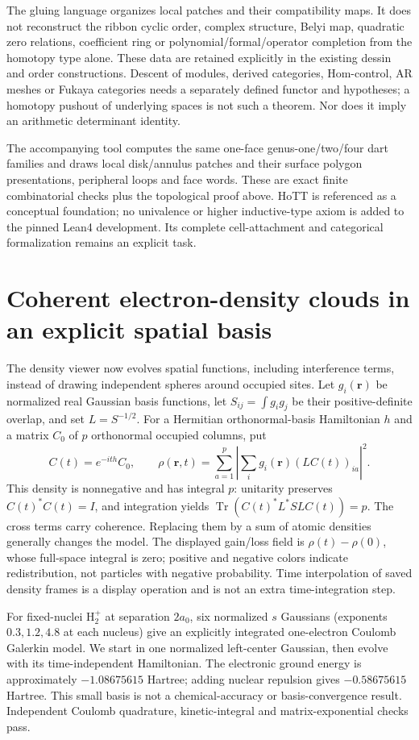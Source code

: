 \documentclass[11pt]{article}
\theoremstyle{definition}\newtheorem{definition}[theorem]{Definition}
\theoremstyle{remark}\newtheorem{remark}[theorem]{Remark}
\begin{document}
The gluing language organizes local patches and their compatibility maps.
It does not reconstruct the ribbon cyclic order, complex structure, Belyi
map, quadratic zero relations, coefficient ring or polynomial/formal/operator
completion from the homotopy type alone. These data are retained explicitly
in the existing dessin and order constructions. Descent of modules, derived
categories, Hom-control, AR meshes or Fukaya categories needs a separately
defined functor and hypotheses; a homotopy pushout of underlying spaces is
not such a theorem. Nor does it imply an arithmetic determinant identity.

The accompanying tool computes the same one-face genus-one/two/four dart
families and draws local disk/annulus patches and their surface polygon
presentations, peripheral loops and face words. These
are exact finite combinatorial checks plus the topological proof above.
HoTT is referenced as a conceptual foundation; no univalence or higher
inductive-type axiom is added to the pinned Lean4 development. Its complete
cell-attachment and categorical formalization remains an explicit task.


\section{Coherent electron-density clouds in an explicit spatial basis}
The density viewer now evolves spatial functions, including interference
terms, instead of drawing independent spheres around occupied sites. Let
$g_i(\mathbf r)$ be normalized real Gaussian basis functions, let
$S_{ij}=\int g_i g_j$ be their positive-definite overlap, and set
$L=S^{-1/2}$. For a Hermitian orthonormal-basis Hamiltonian $h$ and a matrix
$C_0$ of $p$ orthonormal occupied columns, put
\[
 C(t)=e^{-ith}C_0,\qquad
 \rho(\mathbf r,t)=\sum_{a=1}^p
       \left|\sum_i g_i(\mathbf r)(LC(t))_{ia}\right|^2.
\]
This density is nonnegative and has integral $p$: unitarity preserves
$C(t)^*C(t)=I$, and integration yields
$\operatorname{Tr}(C(t)^*L^*SL C(t))=p$. The cross terms carry coherence.
Replacing them by a sum of atomic densities generally changes the model.
The displayed gain/loss field is $\rho(t)-\rho(0)$, whose full-space integral
is zero; positive and negative colors indicate redistribution, not particles
with negative probability. Time interpolation of saved density frames is a
display operation and is not an extra time-integration step.

For fixed-nuclei $\mathrm H_2^+$ at separation $2a_0$, six normalized $s$
Gaussians (exponents $0.3,1.2,4.8$ at each nucleus) give an explicitly
integrated one-electron Coulomb Galerkin model. We start in one normalized
left-center Gaussian, then evolve with its time-independent Hamiltonian.
The electronic ground energy is approximately $-1.08675615$ Hartree;
adding nuclear repulsion gives $-0.58675615$ Hartree. This small basis is not
a chemical-accuracy or basis-convergence result. Independent Coulomb
quadrature, kinetic-integral and matrix-exponential checks pass.
\end{document}

